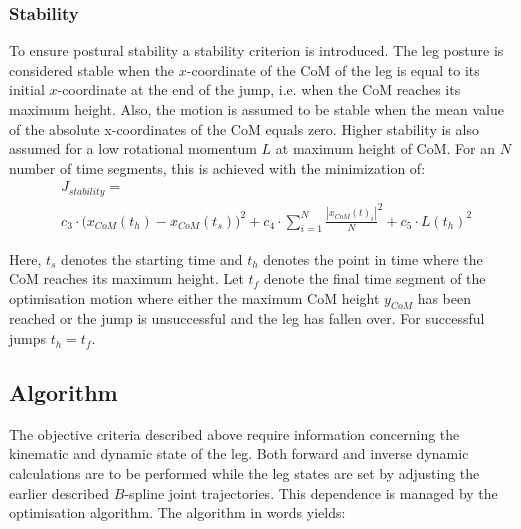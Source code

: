 \documentclass[letterpaper, 10 pt, conference]{ieeeconf}  %
\begin{document}
\subsubsection{Stability}
To ensure postural stability a stability criterion is introduced. The leg posture is considered stable when the $x$-coordinate of the CoM of the leg is equal to its initial $x$-coordinate at the end of the jump, i.e. when the CoM reaches its maximum height. Also, the motion is assumed to be stable when the mean value of the absolute x-coordinates of the CoM equals zero. Higher stability is also assumed for a low rotational momentum $L$ at maximum height of CoM. For an $N$ number of time segments, this is achieved with the minimization of:
 \begin{equation}
 \begin{aligned}
&J_{stability}  =  \\ & c_3\cdot \Big( x_{CoM}(t_h)-x_{CoM}(t_s) \Big)^2  +c_4\cdot  {\sum^{N}_{i=1}\frac{| x_{CoM}(t)_i |}{N}}^2   
				  + c_5  \cdot   L(t_h)^2 
 \end{aligned}
 \end{equation}
 
Here, $t_s$ denotes the starting time and $t_h$ denotes the point in time where the CoM reaches its maximum height. Let $t_f$ denote the final time segment of the optimisation motion where either the maximum CoM height $y_{CoM}$ has been reached or the jump is unsuccessful and the leg has fallen over. For successful jumps $t_h=t_f$. \\

\subsection{Algorithm}

The objective criteria described above require information concerning the kinematic and dynamic state of the leg. Both forward and inverse dynamic calculations are to be performed while the leg states are set by adjusting the earlier described $B$-spline joint trajectories. This dependence is managed by the optimisation algorithm. The algorithm in words yields:\\
\end{document}
